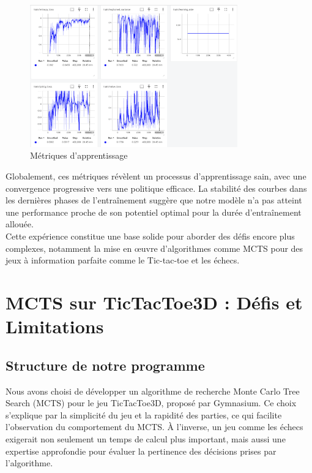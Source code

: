 \documentclass{article}
\begin{document}
        \begin{figure}[ht]
            \centering
            \includegraphics[width=0.8\textwidth]{8.png}
            \caption{Métriques d'apprentissage}
        \end{figure}
    
        Globalement, ces métriques révèlent un processus d'apprentissage sain, avec une convergence progressive vers une politique efficace. La stabilité des courbes dans les dernières phases de l'entraînement suggère que notre modèle  n’a pas atteint une performance proche de son potentiel optimal pour la durée d'entraînement allouée.\\
    
        Cette expérience constitue une base solide pour aborder des défis encore plus complexes, notamment la mise en œuvre d'algorithmes comme MCTS pour des jeux à information parfaite comme le Tic-tac-toe et les échecs.

\clearpage

\section{MCTS sur TicTacToe3D : Défis et Limitations}

\subsection{Structure de notre programme}

\quad Nous avons choisi de développer un algorithme de recherche Monte Carlo Tree Search (MCTS) pour le jeu TicTacToe3D, proposé par Gymnasium. Ce choix s'explique par la simplicité du jeu et la rapidité des parties, ce qui facilite l'observation du comportement du MCTS. À l'inverse, un jeu comme les échecs exigerait non seulement un temps de calcul plus important, mais aussi une expertise approfondie pour évaluer la pertinence des décisions prises par l'algorithme.\\
\end{document}
